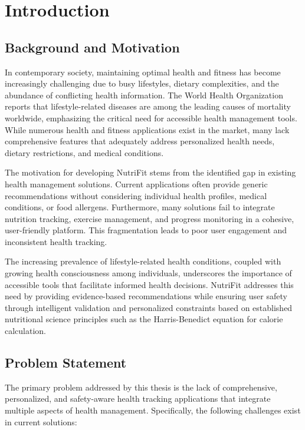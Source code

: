 \chapter{Introduction}

\section{Background and Motivation}

In contemporary society, maintaining optimal health and fitness has become increasingly challenging due to busy lifestyles, dietary complexities, and the abundance of conflicting health information. The World Health Organization reports that lifestyle-related diseases are among the leading causes of mortality worldwide, emphasizing the critical need for accessible health management tools. While numerous health and fitness applications exist in the market, many lack comprehensive features that adequately address personalized health needs, dietary restrictions, and medical conditions.

The motivation for developing NutriFit stems from the identified gap in existing health management solutions. Current applications often provide generic recommendations without considering individual health profiles, medical conditions, or food allergens. Furthermore, many solutions fail to integrate nutrition tracking, exercise management, and progress monitoring in a cohesive, user-friendly platform. This fragmentation leads to poor user engagement and inconsistent health tracking.

The increasing prevalence of lifestyle-related health conditions, coupled with growing health consciousness among individuals, underscores the importance of accessible tools that facilitate informed health decisions. NutriFit addresses this need by providing evidence-based recommendations while ensuring user safety through intelligent validation and personalized constraints based on established nutritional science principles such as the Harris-Benedict equation for calorie calculation.

\section{Problem Statement}

The primary problem addressed by this thesis is the lack of comprehensive, personalized, and safety-aware health tracking applications that integrate multiple aspects of health management. Specifically, the following challenges exist in current solutions:

